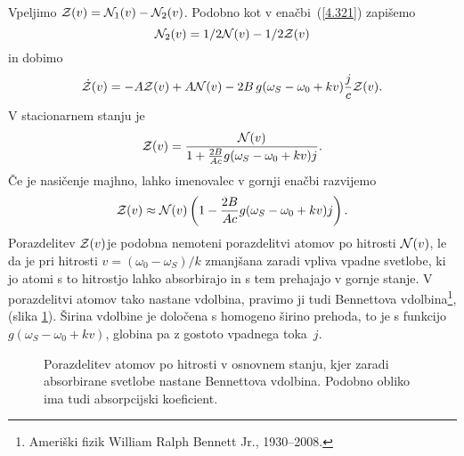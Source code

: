 Vpeljimo ${\cal Z}(v)={\cal N}_{1}(v)-{\cal N}_{2}(v)$. Podobno kot 
v enačbi~(\ref{4.321}) zapišemo
\begin{equation}
{\cal N}_{2}(v)=1/2{\cal N}(v)-1/2{\cal Z}(v)
\end{equation}
in dobimo 
\begin{equation}
\dot{{\cal Z}}(v)=-A{\cal Z}(v)+A{\cal N}(v)
-2B\,g(\omega_S-\omega_{0}+kv)\frac{j}{c}
{\cal Z}(v).
\label{4.87}
\end{equation}
V stacionarnem stanju je 
\begin{equation}
{\cal Z}(v)=\frac{{\cal N}(v)}{1+\frac{2B}{Ac}g(\omega_S-\omega_{0}+kv)j}.
\label{4.88}
\end{equation}
 Če je nasičenje majhno, lahko imenovalec v gornji enačbi razvijemo
\begin{equation}
{\cal Z}(v)\approx{\cal N}(v)\left(1-\frac{2B}{Ac}g(\omega_S-\omega_{0}+kv)j\right).
\label{4.89}
\end{equation}
Porazdelitev ${\cal Z}(v)$je podobna nemoteni porazdelitvi atomov
po hitrosti ${\cal N}(v)$, le da je pri hitrosti $v=(\omega_{0}-\omega_S)/k$
zmanjšana zaradi vpliva vpadne svetlobe, ki jo atomi s to hitrostjo
lahko absorbirajo in s tem prehajajo v gornje stanje. V porazdelitvi
atomov tako nastane vdolbina, 
pravimo ji tudi Bennettova
vdolbina\footnote{Ameriški fizik William Ralph Bennett Jr., 1930--2008.}, 
(slika \ref{fig:Bennet}). Širina vdolbine je določena
s homogeno širino prehoda, to je s funkcijo $g(\omega_S-\omega_{0}+kv)$,
globina pa z gostoto vpadnega toka~$j$.
\begin{figure}[h]
\centering
\def\svgwidth{80truemm} 

\caption{Porazdelitev atomov po hitrosti v osnovnem stanju, kjer zaradi
absorbirane svetlobe nastane Bennettova vdolbina. Podobno obliko ima 
tudi absorpcijski koeficient.}
\label{fig:Bennet}
\end{figure}

